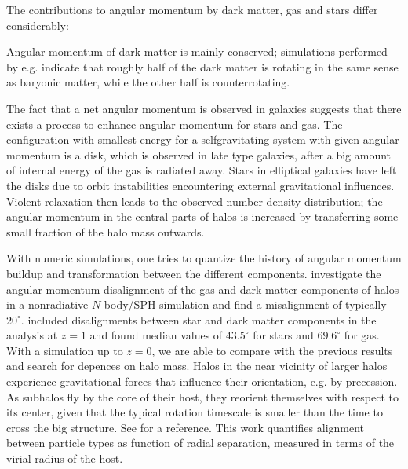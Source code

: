 \documentclass[useAMS,usenatbib]{mn2e}
\begin{document}
The contributions to angular momentum by dark matter, gas and stars differ
considerably:

Angular momentum of dark matter is mainly conserved; simulations performed by
e.g. \cite{Sharma2005} indicate that roughly half of the dark matter is
rotating in the same sense as baryonic matter, while the other half is
counterrotating.

The fact that a net angular momentum is observed in galaxies suggests that
there exists a process to enhance angular momentum for stars and gas. The
configuration with smallest energy for a selfgravitating system with given
angular momentum is a disk, which is observed in late type galaxies, after a
big amount of internal energy of the gas is radiated away. Stars in elliptical
galaxies have left the disks due to orbit instabilities encountering external
gravitational influences. Violent relaxation then leads to the observed number
density distribution; the angular momentum in the central parts of halos is
increased by transferring some small fraction of the halo mass outwards.

With numeric simulations, one tries to quantize the history of angular
momentum buildup and transformation between the different components.
%
\cite{Sharma2005} investigate the angular momentum disalignment of the gas and
dark matter components of halos in a nonradiative $N$-body/SPH simulation and
find a misalignment of typically $20^\circ$. \cite{Croft2008} included
disalignments between star and dark matter components in the analysis at $z=1$
and found median values of $43.5^\circ$ for stars and $69.6^\circ$ for
gas. With a simulation up to $z=0$, we are able to compare with the previous
results and search for depences on halo mass.
Halos in the near vicinity of larger halos experience gravitational forces
that influence their orientation, e.g. by precession. As subhalos fly by the
core of their host, they reorient themselves with respect to its center, given
that the typical rotation timescale is smaller than the time to cross the big
structure. See \cite{Pereira2008} for a reference. This work quantifies
alignment between particle types as function of radial separation, measured in
terms of the virial radius of the host.
\end{document}
